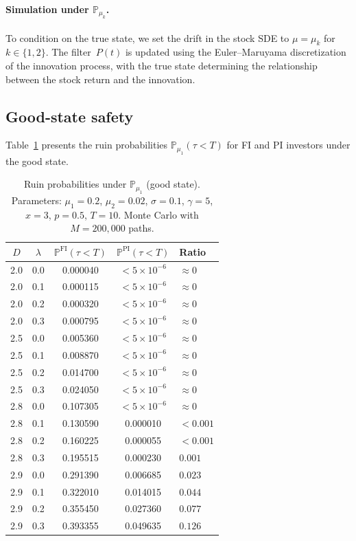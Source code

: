 \documentclass[12pt]{article}
\theoremstyle{remark}
\theoremstyle{definition}
\newcommand{\Prob}{\mathbb{P}}
\newcommand{\FI}{\mathrm{FI}}
\newcommand{\PI}{\mathrm{PI}}
\begin{document}
\paragraph{Simulation under $\Prob_{\mu_k}$.}
To condition on the true state, we set the drift in the stock SDE
to $\mu = \mu_k$ for $k \in \{1, 2\}$.
The filter~$P(t)$ is updated using the Euler--Maruyama discretization
of the innovation process, with the true state determining the
relationship between the stock return and the innovation.


\subsection{Good-state safety}\label{sec:num_good}

Table~\ref{tab:good_state} presents the ruin probabilities
$\Prob_{\mu_1}(\tau < T)$ for FI and PI investors under the good state.

\begin{table}[H]
\centering
\caption{Ruin probabilities under $\Prob_{\mu_1}$ (good state).
  Parameters: $\mu_1 = 0.2$, $\mu_2 = 0.02$, $\sigma = 0.1$,
  $\gamma = 5$, $x = 3$, $p = 0.5$, $T = 10$.
  Monte Carlo with $M = 200{,}000$ paths.}
\label{tab:good_state}
\smallskip
\begin{tabular}{ccccl}
\toprule
$D$ & $\lambda$ & $\Prob^{\FI}(\tau < T)$
    & $\Prob^{\PI}(\tau < T)$ & Ratio \\
\midrule
2.0 & 0.0 & 0.000040 & ${<}5{\times}10^{-6}$ & $\approx 0$ \\
2.0 & 0.1 & 0.000115 & ${<}5{\times}10^{-6}$ & $\approx 0$ \\
2.0 & 0.2 & 0.000320 & ${<}5{\times}10^{-6}$ & $\approx 0$ \\
2.0 & 0.3 & 0.000795 & ${<}5{\times}10^{-6}$ & $\approx 0$ \\
\midrule
2.5 & 0.0 & 0.005360 & ${<}5{\times}10^{-6}$ & $\approx 0$ \\
2.5 & 0.1 & 0.008870 & ${<}5{\times}10^{-6}$ & $\approx 0$ \\
2.5 & 0.2 & 0.014700 & ${<}5{\times}10^{-6}$ & $\approx 0$ \\
2.5 & 0.3 & 0.024050 & ${<}5{\times}10^{-6}$ & $\approx 0$ \\
\midrule
2.8 & 0.0 & 0.107305 & ${<}5{\times}10^{-6}$ & $\approx 0$ \\
2.8 & 0.1 & 0.130590 & 0.000010 & $< 0.001$ \\
2.8 & 0.2 & 0.160225 & 0.000055 & $< 0.001$ \\
2.8 & 0.3 & 0.195515 & 0.000230 & $0.001$ \\
\midrule
2.9 & 0.0 & 0.291390 & 0.006685 & $0.023$ \\
2.9 & 0.1 & 0.322010 & 0.014015 & $0.044$ \\
2.9 & 0.2 & 0.355450 & 0.027360 & $0.077$ \\
2.9 & 0.3 & 0.393355 & 0.049635 & $0.126$ \\
\bottomrule
\end{tabular}
\end{table}
\end{document}
